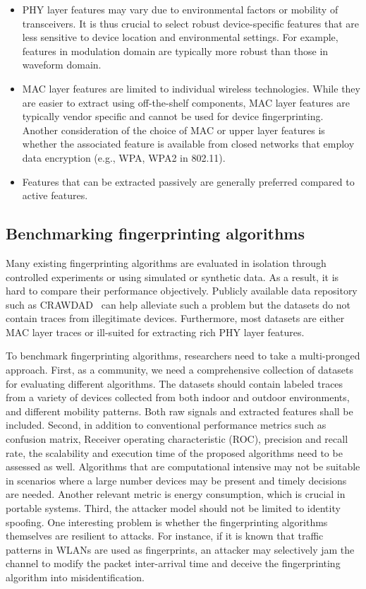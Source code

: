\documentclass[journal,draftcls,onecolumn,11pt]{IEEEtran}
\begin{document}
\begin{itemize}
\item PHY layer features may vary due to environmental factors or mobility of transceivers. It is thus crucial to select robust device-specific features that are less sensitive to device location and environmental settings. For example, features in modulation domain are typically more robust than those in waveform domain.

\item MAC layer features are limited to individual wireless technologies. While they are easier to extract using off-the-shelf components, MAC layer features are typically vendor specific and cannot be used for device fingerprinting. Another consideration of the choice of MAC or upper layer features is whether the associated feature is available from closed networks that employ data encryption (e.g., WPA, WPA2 in 802.11).

\item Features that can be extracted passively are generally preferred compared to active features.
\end{itemize}

\subsection{Benchmarking fingerprinting algorithms}

Many existing fingerprinting algorithms are evaluated in isolation through controlled experiments or using simulated or synthetic data. As a result, it is hard to compare their performance objectively. Publicly available data repository such as CRAWDAD~\cite{Crawdad}  can help alleviate such a problem but the datasets do not contain traces from illegitimate devices. Furthermore, most datasets are either MAC layer traces or ill-suited for extracting rich PHY layer features.

To benchmark fingerprinting algorithms, researchers need to take a multi-pronged approach. First, as a community, we need a comprehensive collection of datasets for evaluating different algorithms. The datasets should contain labeled traces from a variety of devices collected from both indoor and outdoor environments, and different mobility patterns. Both raw signals and extracted features shall be included. Second, in addition to conventional performance metrics such as confusion matrix, Receiver operating characteristic (ROC), precision and recall rate, the scalability and execution time of the proposed algorithms  need to be assessed as well. Algorithms that are computational intensive may not be suitable in scenarios where a large number devices may be present and timely decisions are needed. Another relevant metric is energy consumption, which is crucial in portable systems. Third, the attacker model should not be limited to identity spoofing. One interesting problem is whether the fingerprinting algorithms themselves are resilient to attacks. For instance, if it is known that traffic patterns in WLANs are used as fingerprints, an attacker may selectively jam the channel to modify the packet inter-arrival time and deceive the fingerprinting algorithm into misidentification.
\end{document}
